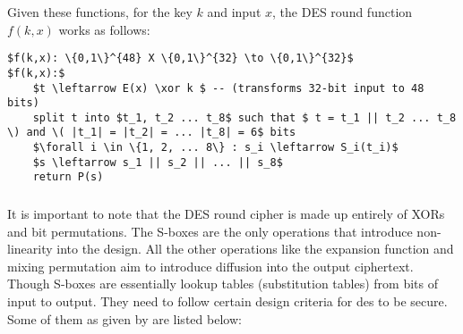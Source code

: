 Given these functions, for the key $k$ and input $x$, the DES round function $f(k, x)$ works as follows: \newline

\lstset{basicstyle=\footnotesize, columns=fullflexible}
\begin{lstlisting}[mathescape]
$f(k,x): \{0,1\}^{48} X \{0,1\}^{32} \to \{0,1\}^{32}$
$f(k,x):$
    $t \leftarrow E(x) \xor k $ -- (transforms 32-bit input to 48 bits) 
    split t into $t_1, t_2 ... t_8$ such that $ t = t_1 || t_2 ... t_8 \) and \( |t_1| = |t_2| = ... |t_8| = 6$ bits 
    $\forall i \in \{1, 2, ... 8\} : s_i \leftarrow S_i(t_i)$
    $s \leftarrow s_1 || s_2 || ... || s_8$
    return P(s)
\end{lstlisting}

 \newline
{}
\subsubsection*{} It is important to note that the DES round cipher is made up entirely of XORs and bit permutations. The S-boxes are the only operations that introduce non-linearity into the design. All the other operations like the expansion function and mixing permutation aim to introduce diffusion into the output ciphertext. \newline
Though S-boxes are essentially lookup tables (substitution tables) from bits of input to output. They need to follow certain design criteria for des to be secure. Some of them as given by \cite{CopersmithDES} are listed below: 

